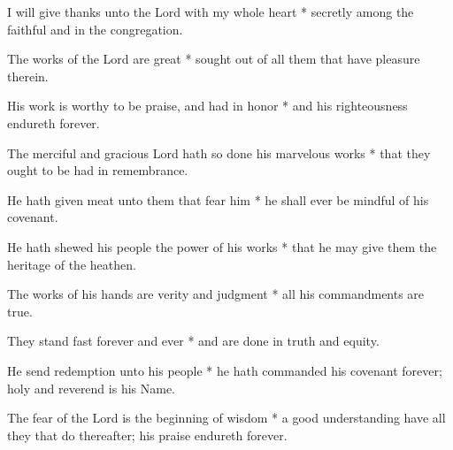 I will give thanks unto the Lord with my whole heart * secretly among the faithful and in the congregation.

The works of the Lord are great * sought out of all them that have pleasure therein.
	
His work is worthy to be praise, and had in honor * and his righteousness endureth forever.
	
The merciful and gracious Lord hath so done his marvelous works * that they ought to be had in remembrance.
	
He hath given meat unto them that fear him * he shall ever be mindful of his covenant.
	
He hath shewed his people the power of his works * that he may give them the heritage of the heathen.
	
The works of his hands are verity and judgment * all his commandments are true.
	
They stand fast forever and ever * and are done in truth and equity.
	
He send redemption unto his people * he hath commanded his covenant forever; holy and reverend is his Name.
	
The fear of the Lord is the beginning of wisdom * a good understanding have all they that do thereafter; his praise endureth forever.